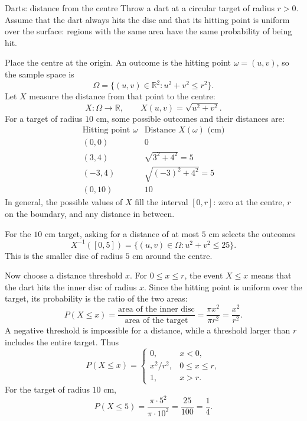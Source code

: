 \documentclass[a4paper,12pt,oneside]{report}
\begin{document}
\clearpage
\begin{framedexample}{Darts: distance from the centre}\label{ex:darts-areas}
Throw a dart at a circular target of radius $r>0$. Assume that the dart
always hits the disc and that its hitting point is uniform over the
surface: regions with the same area have the same probability of being hit.

Place the centre at the origin. An outcome is the hitting point
$\omega=(u,v)$, so the sample space is
\[
  \Omega=\{(u,v)\in\mathbb R^2:u^2+v^2\leq r^2\}.
\]
Let $X$ measure the distance from that point to the centre:
\[
  X:\Omega\to\mathbb R,
  \qquad X(u,v)=\sqrt{u^2+v^2}.
\]
For a target of radius $10$ cm, some possible outcomes and their distances
are:
\[
  \begin{array}{c|c}
    \text{Hitting point }\omega & \text{Distance }X(\omega)\text{ (cm)}\\
    \hline
    (0,0) & 0\\
    (3,4) & \sqrt{3^2+4^2}=5\\
    (-3,4) & \sqrt{(-3)^2+4^2}=5\\
    (0,10) & 10
  \end{array}
\]
In general, the possible values of $X$ fill the
interval $[0,r]$: zero at the centre, $r$ on the boundary, and any
distance in between.

For the $10$ cm target, asking for a distance of at most $5$ cm selects
the outcomes
\[
  X^{-1}([0,5])
    =\{(u,v)\in\Omega:u^2+v^2\leq25\}.
\]
This is the smaller disc of radius $5$ cm around the centre.

Now choose a distance threshold $x$. For $0\leq x\leq r$, the event
$X\leq x$ means that the dart hits the inner disc of radius $x$.
Since the hitting point is uniform over the target, its probability
is the ratio of the two areas:
\[
  P(X\leq x)
    =\frac{\text{area of the inner disc}}{\text{area of the target}}
    =\frac{\pi x^2}{\pi r^2}
    =\frac{x^2}{r^2}.
\]
A negative threshold is impossible for a distance, while a threshold
larger than $r$ includes the entire target. Thus
\[
  \boxed{P(X\leq x)=
    \begin{cases}
      0, & x<0,\\[2pt]
      x^2/r^2, & 0\leq x\leq r,\\[2pt]
      1, & x>r.
    \end{cases}}
\]
For the target of radius $10$ cm,
\[
  P(X\leq5)=\frac{\pi\cdot5^2}{\pi\cdot10^2}
    =\frac{25}{100}=\frac14.
\]
\end{framedexample}
\end{document}
